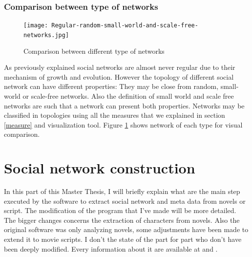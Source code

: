 \documentclass[a4paper, 12pt]{report}
\begin{document}
\subsection{Comparison between type of networks}

\begin{figure}
\centering
\texttt{[image: Regular-random-small-world-and-scale-free-networks.jpg]}
\caption{Comparison between different type of networks \citep{img_comp}}
\label{comparison_networks}
\end{figure}

As previously explained social networks are almost never regular due to their mechanism of growth and evolution. However the topology of different social network can have different properties: They may be close from random, small-world or scale-free networks. Also the definition of small world and scale free networks are such that a network can present both properties. Networks may be classified in topologies using all the measures that we explained in section \ref{measure} and visualization tool. Figure \ref{comparison_networks} shows network of each type for visual comparison.









\chapter{Social network construction}

In this part of this Master Thesis, I will briefly explain what are the main step executed by the software to extract social network and meta data from novels or script. The modification of the program that I've made will be more detailed. The bigger changes concerns the extraction of characters from novels.  Also the original software was only analyzing novels, some adjustments have been made to extend it to movie scripts. I don't the state of the part for part who don't have been deeply modified. Every information about it are available at \cite{original} and \cite{original_thesis}. 
\end{document}
